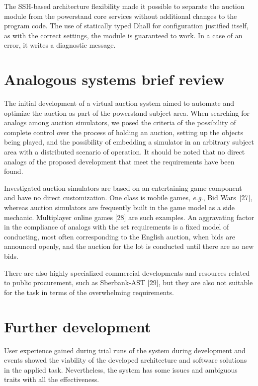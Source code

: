 \documentclass[
]{ceurart}
\begin{document}
The SSH-based architecture flexibility made it possible to separate the auction module from the powerstand core services without additional changes to the program code. The use of statically typed Dhall for configuration ​​justified itself, as with the correct settings, the module is guaranteed to work. In a case of an error, it writes a diagnostic message.

\section{Analogous systems brief review}
\label{sec:analogs}

The initial development of a virtual auction system aimed to automate and optimize the auction as part of the powerstand subject area. When searching for analogs among auction simulators, we posed the criteria of the possibility of complete control over the process of holding an auction, setting up the objects being played, and the possibility of embedding a simulator in an arbitrary subject area with a distributed scenario of operation. It should be noted that no direct analogs of the proposed development that meet the requirements have been found.

Investigated auction simulators are based on an entertaining game component and have no direct customization. One class is mobile games, \emph{e.g}., Bid Wars~[27], whereas auction simulators are frequently built in the game model as a side mechanic. Multiplayer online games [28] are such examples. An aggravating factor in the compliance of analogs with the set requirements is a fixed model of conducting, most often corresponding to the English auction, when bids are announced openly, and the auction for the lot is conducted until there are no new bids.

There are also highly specialized commercial developments and resources related to public procurement, such as Sberbank-AST [29], but they are also not suitable for the task in terms of the overwhelming requirements.

\section{Further development}
\label{sec:further}

User experience gained during trial runs of the system during development and events showed the viability of the developed architecture and software solutions in the applied task. Nevertheless, the system has some issues and ambiguous traits with all the effectiveness.
\end{document}
